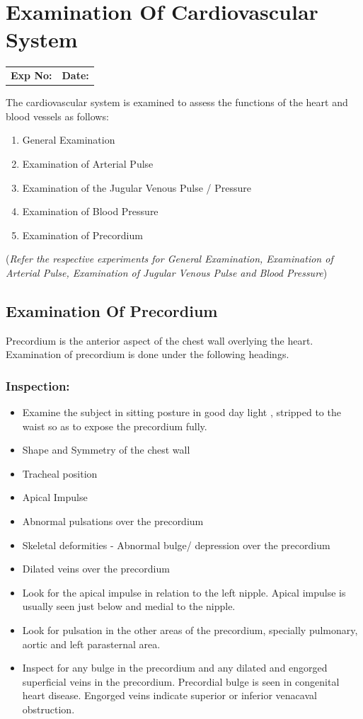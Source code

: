 \documentclass[a4paper,12pt]{book}
\begin{document}
															\chapter*{\centering Examination Of Cardiovascular System}
															\begin{tabular}{p{5in} p{1in}}
																\textbf{Exp No:}  & \textbf{Date:}\\
															\end{tabular}
The cardiovascular system is examined to assess the functions of the heart and blood vessels as follows:
\begin{enumerate}
\item{General Examination}
\item{Examination of Arterial Pulse}
\item{Examination of the Jugular Venous Pulse / Pressure}
\item{Examination of Blood Pressure}
\item{Examination of Precordium}
\end{enumerate}

(\emph{Refer the respective experiments for General Examination, Examination of Arterial Pulse, Examination of Jugular Venous Pulse and Blood Pressure})

\section*{Examination Of Precordium}
\par
Precordium is the anterior aspect of the chest wall overlying the heart. Examination of precordium is done under the following headings.
\subsection*{Inspection:}
\par
\begin{itemize}
\item{Examine the subject in sitting posture in good day light , stripped to the waist so as to expose the precordium fully.}
\item{Shape and Symmetry of the chest wall}
\item{Tracheal position}
\item{Apical Impulse}
\item{Abnormal pulsations over the precordium}
\item{Skeletal deformities - Abnormal bulge/ depression over the precordium}
\item{Dilated veins over the precordium}
\item{	Look for the apical impulse in relation to the left nipple. Apical impulse is usually seen just below and medial to the nipple.}
\item{	Look for pulsation in the other areas of the precordium, specially pulmonary, aortic and left parasternal area.}
\item{	Inspect for any bulge in the precordium and any dilated and engorged superficial veins in the precordium. Precordial bulge is seen in congenital heart disease. Engorged veins indicate superior or inferior venacaval obstruction.}
\end{itemize}
\end{document}
